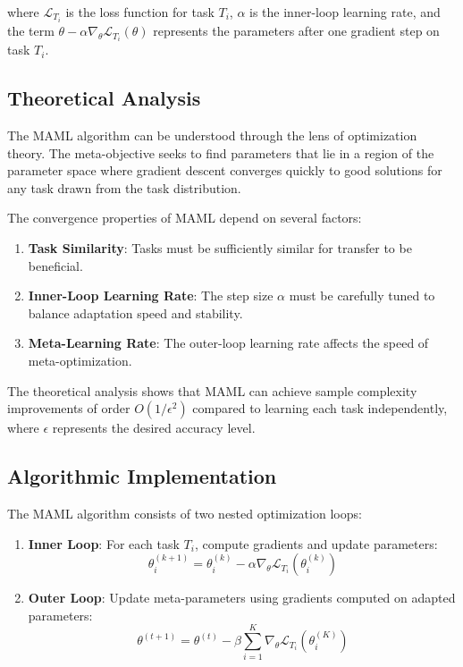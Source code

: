 \documentclass[12pt]{article}
\begin{document}
{{{where $\mathcal{L}_{T_i}$ is the loss function for task $T_i$, $\alpha$ is the inner-loop learning rate, and the term $\theta - \alpha \nabla_\theta \mathcal{L}_{T_i}(\theta)$ represents the parameters after one gradient step on task $T_i$.

\subsection{Theoretical Analysis}

The MAML algorithm can be understood through the lens of optimization theory. The meta-objective seeks to find parameters that lie in a region of the parameter space where gradient descent converges quickly to good solutions for any task drawn from the task distribution.

The convergence properties of MAML depend on several factors:

\begin{enumerate}
\item \textbf{Task Similarity}: Tasks must be sufficiently similar for transfer to be beneficial.
\item \textbf{Inner-Loop Learning Rate}: The step size $\alpha$ must be carefully tuned to balance adaptation speed and stability.
\item \textbf{Meta-Learning Rate}: The outer-loop learning rate affects the speed of meta-optimization.
\end{enumerate}

The theoretical analysis shows that MAML can achieve sample complexity improvements of order $O(1/\epsilon^2)$ compared to learning each task independently, where $\epsilon$ represents the desired accuracy level.

\subsection{Algorithmic Implementation}

The MAML algorithm consists of two nested optimization loops:

\begin{enumerate}
\item \textbf{Inner Loop}: For each task $T_i$, compute gradients and update parameters:
\begin{equation}
\theta_i^{(k+1)} = \theta_i^{(k)} - \alpha \nabla_\theta \mathcal{L}_{T_i}(\theta_i^{(k)})
\end{equation}

\item \textbf{Outer Loop}: Update meta-parameters using gradients computed on adapted parameters:
\begin{equation}
\theta^{(t+1)} = \theta^{(t)} - \beta \sum_{i=1}^K \nabla_\theta \mathcal{L}_{T_i}(\theta_i^{(K)})
\end{equation}
\end{enumerate}

}}}
\end{document}
